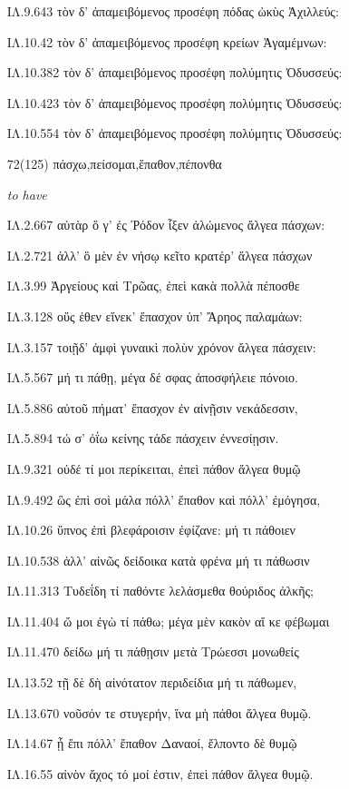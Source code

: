 \begin{enumerate}
{ΙΛ.9.643 τὸν δ' ἀπαμειβόμενος προσέφη πόδας ὠκὺς Ἀχιλλεύς: 

ΙΛ.10.42 τὸν δ' ἀπαμειβόμενος προσέφη κρείων Ἀγαμέμνων: 

ΙΛ.10.382 τὸν δ' ἀπαμειβόμενος προσέφη πολύμητις Ὀδυσσεύς: 

ΙΛ.10.423 τὸν δ' ἀπαμειβόμενος προσέφη πολύμητις Ὀδυσσεύς: 

ΙΛ.10.554 τὸν δ' ἀπαμειβόμενος προσέφη πολύμητις Ὀδυσσεύς: 

}

\clearpage
\item[\large 72(125)]{\large \g πάσχω,πείσομαι,ἔπαθον,πέπονθα }

\hspace{0.2cm} \textit{ to have }

{\g
ΙΛ.2.667 αὐτὰρ ὅ γ' ἐς Ῥόδον ἷξεν ἀλώμενος ἄλγεα πάσχων: 

ΙΛ.2.721 ἀλλ' ὃ μὲν ἐν νήσῳ κεῖτο κρατέρ' ἄλγεα πάσχων 

ΙΛ.3.99 Ἀργείους καὶ Τρῶας, ἐπεὶ κακὰ πολλὰ πέποσθε 

ΙΛ.3.128 οὕς ἑθεν εἵνεκ' ἔπασχον ὑπ' Ἄρηος παλαμάων: 

ΙΛ.3.157 τοιῇδ' ἀμφὶ γυναικὶ πολὺν χρόνον ἄλγεα πάσχειν: 

ΙΛ.5.567 μή τι πάθῃ, μέγα δέ σφας ἀποσφήλειε πόνοιο. 

ΙΛ.5.886 αὐτοῦ πήματ' ἔπασχον ἐν αἰνῇσιν νεκάδεσσιν, 

ΙΛ.5.894 τώ σ' ὀΐω κείνης τάδε πάσχειν ἐννεσίῃσιν. 

ΙΛ.9.321 οὐδέ τί μοι περίκειται, ἐπεὶ πάθον ἄλγεα θυμῷ 

ΙΛ.9.492 ὣς ἐπὶ σοὶ μάλα πόλλ' ἔπαθον καὶ πόλλ' ἐμόγησα, 

ΙΛ.10.26 ὕπνος ἐπὶ βλεφάροισιν ἐφίζανε: μή τι πάθοιεν 

ΙΛ.10.538 ἀλλ' αἰνῶς δείδοικα κατὰ φρένα μή τι πάθωσιν 

ΙΛ.11.313 Τυδεΐδη τί παθόντε λελάσμεθα θούριδος ἀλκῆς; 

ΙΛ.11.404 ὤ μοι ἐγὼ τί πάθω; μέγα μὲν κακὸν αἴ κε φέβωμαι 

ΙΛ.11.470 δείδω μή τι πάθῃσιν μετὰ Τρώεσσι μονωθείς 

ΙΛ.13.52 τῇ δὲ δὴ αἰνότατον περιδείδια μή τι πάθωμεν, 

ΙΛ.13.670 νοῦσόν τε στυγερήν, ἵνα μὴ πάθοι ἄλγεα θυμῷ. 

ΙΛ.14.67 ᾗ ἔπι πόλλ' ἔπαθον Δαναοί, ἔλποντο δὲ θυμῷ 

ΙΛ.16.55 αἰνὸν ἄχος τό μοί ἐστιν, ἐπεὶ πάθον ἄλγεα θυμῷ. 

}
\end{enumerate}
